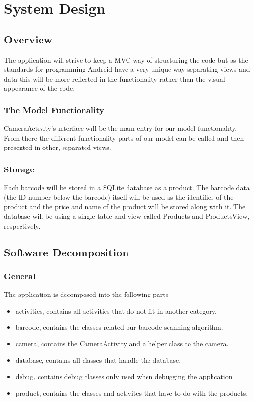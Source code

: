 \documentclass{report}
\begin{document}
\chapter{System Design}

\section{Overview}
The application will strive to keep a MVC way of structuring the code but as the standards for programming Android have a very unique way separating views and data this will be more reflected in the functionality rather than the visual appearance of the code.

\subsection{The Model Functionality}
CameraActivity's interface will be the main entry for our model functionality. From there the different functionality parts of our model can be called and then presented in other, separated views.

\subsection{Storage}
Each barcode will be stored in a SQLite database as a product. The barcode data (the ID number below the barcode) itself will be used as the identifier of the product and the price and name of the product will be stored along with it. The database will be using a single table and view called Products and ProductsView, respectively.

\pagebreak

\section{Software Decomposition}

\subsection{General}

The application is decomposed into the following parts:

\begin{itemize}
  \item{activities}, contains all activities that do not fit in another category.
  \item{barcode}, contains the classes related our barcode scanning algorithm.
  \item{camera}, contains the CameraActivity and a helper class to the camera.
  \item{database}, contains all classes that handle the database.
  \item{debug}, contains debug classes only used when debugging the application.
  \item{product}, contains the classes and activites that have to do with the products.
\end{itemize}
\end{document}
